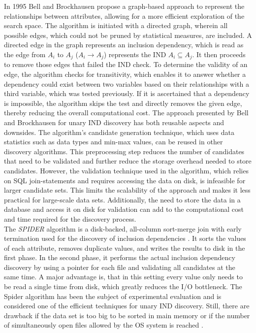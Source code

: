 In 1995 Bell and Brockhausen \cite{bell1995discovery} propose a graph-based approach to represent the relationships between attributes, allowing for a more efficient exploration of the search space. The algorithm is initiated with a directed graph, wherein all possible edges, which could not be pruned by statistical measures, are included. A directed edge in the graph represents an inclusion dependency, which is read as the edge from $A_i$ to $A_j$ ($A_i \rightarrow A_j$) represents the IND $A_i \subseteq A_j$. It then proceeds to remove those edges that failed the IND check. To determine the validity of an edge, the algorithm checks for transitivity, which enables it to answer whether a dependency could exist between two variables based on their relationships with a third variable, which was tested previously. If it is ascertained that a dependency is impossible, the algorithm skips the test and directly removes the given edge, thereby reducing the overall computational cost. The approach presented by Bell and Brockhausen for unary IND discovery has both reusable aspects and downsides. The algorithm's candidate generation technique, which uses data statistics such as data types and min-max values, can be reused in other discovery algorithms. This preprocessing step reduces the number of candidates that need to be validated and further reduce the storage overhead needed to store candidates. However, the validation technique used in the algorithm, which relies on SQL join-statements and requires accessing the data on disk, is infeasible for larger candidate sets. This limits the scalability of the approach and makes it less practical for large-scale data sets. Additionally, the need to store the data in a database and access it on disk for validation can add to the computational cost and time required for the discovery process.\\

The \textit{SPIDER} algorithm is a disk-backed, all-column sort-merge join with early termination used for the discovery of inclusion dependencies \cite{bauckmann2006efficiently}. It sorts the values of each attribute, removes duplicate values, and writes the results to disk in the first phase. In the second phase, it performs the actual inclusion dependency discovery by using a pointer for each file and validating all candidates at the same time. A major advantage is, that in this setting every value only needs to be read a single time from disk, which greatly reduces the I/O bottleneck. The Spider algorithm has been the subject of experimental evaluation and is considered one of the efficient techniques for unary IND discovery. Still, there are drawback if the data set is too big to be sorted in main memory or if the number of simultaneously open files allowed by the OS system is reached \cite{papenbrock2015divide}. \\

